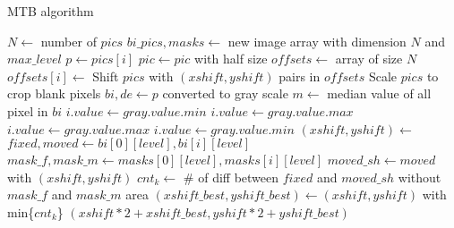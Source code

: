 \begin{algorithm}
\caption{MTB algorithm \cite{ref:Ward}}
\begin{algorithmic}[1]
	\State $N\gets$ number of $pics$
	\State $bi\_pics, masks\gets$ new image array with dimension $N$ and $max\_level$
		\State $p\gets pics[i]$
			\State {}
			\State $pic\gets pic$ with half size
		\EndFor
	\EndFor
	\State $offsets\gets$ array of size $N$
		\State $offsets[i]\gets$
	\EndFor
	\State Shift $pics$ with $(xshift, yshift)$ pairs in $offsets$
	\State Scale $pics$ to crop blank pixels
\EndFunction
\Statex
{}
	\State $bi, de\gets p$ converted to gray scale
	\State $m\gets$ median value of all pixel in $bi$
			\State $i.value\gets gray.value.min$
		\Else
			\State $i.value\gets gray.value.max$
		\EndIf
	\EndFor
			\State $i.value\gets gray.value.max$
		\Else
			\State $i.value\gets gray.value.min$
		\EndIf
	\EndFor
\EndFunction
\Statex
{}
		\State {}
	\EndIf
	\State $(xshift, yshift)\gets$
	\State $fixed, moved\gets bi[0][level], bi[i][level]$
	\State $mask\_f, mask\_m\gets masks[0][level], masks[i][level]$
		\State $moved\_sh\gets moved$ with $(xshift, yshift)$
		\State $cnt_k\gets$ \# of diff between $fixed$ and $moved\_sh$
without $mask\_f$ and $mask\_m$ area	
	\EndFor
	\State $(xshift\_best, yshift\_best)\gets(xshift, yshift)$ with min\{$cnt_k$\}
	\State\Return$(xshift*2+xshift\_best, yshift*2+yshift\_best)$
\EndFunction
\end{algorithmic}
\end{algorithm}